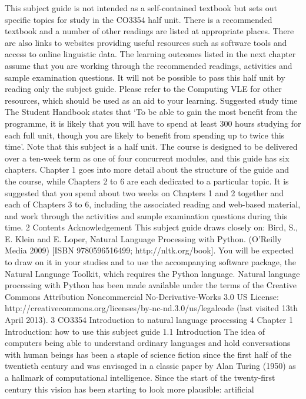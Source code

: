 This subject guide is not intended as a self-contained textbook but sets out specific
topics for study in the CO3354 half unit. There is a recommended textbook and a
number of other readings are listed at appropriate places. There are also links to
websites providing useful resources such as software tools and access to online
linguistic data. The learning outcomes listed in the next chapter assume that you are
working through the recommended readings, activities and sample examination
questions. It will not be possible to pass this half unit by reading only the subject
guide. Please refer to the Computing VLE for other resources, which should be used
as an aid to your learning.
Suggested study time
The Student Handbook states that ‘To be able to gain the most benefit from the
programme, it is likely that you will have to spend at least 300 hours studying for
each full unit, though you are likely to benefit from spending up to twice this time’.
Note that this subject is a half unit.
The course is designed to be delivered over a ten-week term as one of four
concurrent modules, and this guide has six chapters. Chapter 1 goes into more detail
about the structure of the guide and the course, while Chapters 2 to 6 are each
dedicated to a particular topic. It is suggested that you spend about two weeks on
Chapters 1 and 2 together and each of Chapters 3 to 6, including the associated
reading and web-based material, and work through the activities and sample
examination questions during this time.
2
Contents
Acknowledgement
This subject guide draws closely on:
Bird, S., E. Klein and E. Loper, Natural Language Processing with Python. (O’Reilly
Media 2009) [ISBN 9780596516499; http://nltk.org/book].
You will be expected to draw on it in your studies and to use the accompanying
software package, the Natural Language Toolkit, which requires the Python
language. Natural language processing with Python has been made available under
the terms of the Creative Commons Attribution Noncommercial No-Derivative-Works
3.0 US License: http://creativecommons.org/licenses/by-nc-nd.3.0/us/legalcode (last
visited 13th April 2013).
3
CO3354 Introduction to natural language processing
4
Chapter 1
Introduction: how to use this subject guide
1.1 Introduction
The idea of computers being able to understand ordinary languages and hold
conversations with human beings has been a staple of science fiction since the first
half of the twentieth century and was envisaged in a classic paper by Alan Turing
(1950) as a hallmark of computational intelligence. Since the start of the
twenty-first century this vision has been starting to look more plausible: artificial
